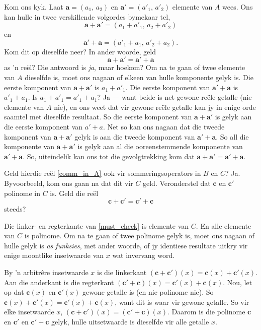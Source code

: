 \documentclass[a4paper,11pt]{book}
\theoremstyle{definition}
\newcommand{\be}{\begin{equation}}
\newcommand{\ee}{\end{equation}}
\newcommand{\ve}[1]{\mathbf{#1}}
\begin{document}
Kom ons kyk.  Laat $\ve{a} = (a_1, \,a_2)$ en $\ve{a}' = (a'_1, \, a'_2)$
elemente van $A$ wees.  Ons kan hulle in twee verskillende volgordes
bymekaar tel,
\[
	\ve{a} + \ve{a}' = (a_1 + a'_1, \, a_2 + a'_2)
\]
en
\[
	\ve{a}' + \ve{a} = (a'_1 + a_1, \, a'_2 + a_2).
\]
Kom dit op dieselfde neer? In ander woorde, geld
\be \label{comm_in_A}
\ve{a} + \ve{a}' = \ve{a}' + \ve{a}
\ee
as 'n re{\"e}l? Die antwoord is \emph{ja}, maar hoekom?  Om na te gaan of
twee elemente van $A$ dieselfde is, moet ons nagaan of elkeen van hulle
komponente gelyk is.  Die eerste komponent van $\ve{a} + \ve{a}'$ is $a_1 +
a'_1$.  Die eerste komponent van $\ve{a}' + \ve{a}$ is $a'_1 + a_1$. Is
$a_1 + a'_1 = a'_1 + a_1$? Ja --- want beide is net gewone re{\"e}le
getalle (nie elemente van $A$ nie), en ons weet dat vir gewone re{\"e}le
getalle kan jy in enige orde saamtel met dieselfde resultaat.  So die
eerste komponent van $\ve{a} + \ve{a}'$ is gelyk aan die eerste komponent
van $a' + a$.  Net so kan ons nagaan dat die tweede komponent van $\ve{a} +
\ve{a}'$ gelyk is aan die tweede komponent van $\ve{a}' + \ve{a}$. So all
die komponente van $\ve{a} + \ve{a}'$ is gelyk aan al die ooreenstemmende
komponente van $\ve{a}' + \ve{a}$. So, uiteindelik kan ons tot die
gevolgtrekking kom dat $\ve{a} + \ve{a}' = \ve{a}' + \ve{a}$.

Geld hierdie re{\"e}l \eqref{comm_in_A} ook vir sommeringsoperators in $B$
en $C$? Ja. Byvoorbeeld, kom ons gaan na dat dit vir $C$ geld.
Veronderstel dat $\ve{c}$ en $\ve{c}'$ polinome in $C$ is.  Geld die
re{\"e}l
\be
\ve{c} + \ve{c}' = \ve{c}' + \ve{c} \label{must_check}
\ee
steeds?

Die linker- en regterkante van \eqref{must_check} is elemente van $C$.  En
alle elemente van $C$ is polinome.  Om na te gaan of twee polinome gelyk
is, moet ons nagaan of hulle gelyk is \emph{as funksies}, met ander woorde,
of jy identiese resultate uitkry vir enige moontlike insetwaarde van $x$
wat invervang word.

By 'n arbitr{\^e}re insetwaarde $x$ is die linkerkant $(\ve{c} +
\ve{c}')(x) = \ve{c}(x) + \ve{c}'(x)$.  Aan die anderkant is die regterkant
$(\ve{c}' + \ve{c})(x) = \ve{c}'(x) + \ve{c}(x)$. Nou, let op dat
$\ve{c}(x)$ en $\ve{c}'(x)$ gewone getalle is (en nie polinome nie).  So
$\ve{c}(x) + \ve{c}'(x) = \ve{c}'(x) + \ve{c}(x)$, want dit is waar vir
gewone getalle. So vir elke insetwaarde $x$, $(\ve{c} + \ve{c}') (x) =
(\ve{c}' + \ve{c})(x)$.  Daarom is die polinome $\ve{c}$ en $\ve{c}'$ en
$\ve{c}' + \ve{c}$ gelyk, hulle uitsetwaarde is dieselfde vir alle getalle
$x$.
\end{document}
